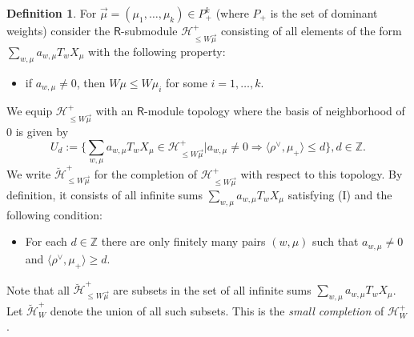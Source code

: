 \documentclass{amsart}
\newcommand{\Hecke}{\mathcal{H}}
\newcommand{\Z}{\mathbb{Z}}
\newcommand{\Ring}{\mathsf{R}}
\newtheorem{Lem}[Thm]{Lemma}
\theoremstyle{definition}
\newtheorem{defi}[Thm]{Definition}
\numberwithin{equation}{section}
\begin{document}


\begin{defi}\label{defi:small_completion}
For $\vec{\mu}=(\mu_1,\ldots,\mu_k)\in P_+^k$ (where $P_+$ is the set of dominant weights)
consider the $\Ring$-submodule $\Hecke^+_{\leqslant W\vec{\mu}}$
consisting of all elements of the form $\sum_{w,\mu} a_{w,\mu}T_w X_\mu$ with the following property:
\begin{itemize}
\item[(I)] if $a_{w,\mu}\neq 0$, then $W\mu\leqslant W\mu_i$ for some $i=1,\ldots,k$.
\end{itemize}
We equip $\Hecke^+_{\leqslant W\vec{\mu}}$ with an $\Ring$-module topology  where the basis of neighborhood of $0$ is given by
$$U_d:=\{\sum_{w,\mu}a_{w,\mu}T_w X_\mu\in \Hecke^+_{\leqslant W\vec{\mu}}| a_{w,\mu}\neq 0\Rightarrow \langle\rho^\vee,\mu_+\rangle\leqslant d\}, d\in \Z.$$
We write $\breve{\Hecke}^+_{\leqslant W\vec{\mu}}$ for the completion of $\Hecke^+_{\leqslant W\vec{\mu}}$ with respect to this topology. By definition, it consists of all infinite sums
$\sum_{w,\mu}a_{w,\mu}T_w X_\mu$ satisfying (I) and the following condition:
\begin{itemize}
\item[(II)] For each $d\in \Z$ there are only finitely many pairs $(w,\mu)$ such that $a_{w,\mu}\neq 0$ and $\langle\rho^\vee, \mu_+\rangle\geqslant d$.
\end{itemize}
Note that all $\breve{\Hecke}^+_{\leqslant W\vec{\mu}}$ are subsets in the set of all infinite sums $\sum_{w,\mu}a_{w,\mu}T_wX_\mu$. Let $\breve{\Hecke}^+_W$ denote the union of all such subsets. This is the {\it small completion} of $\Hecke^+_W$.

\end{defi}
\end{document}
